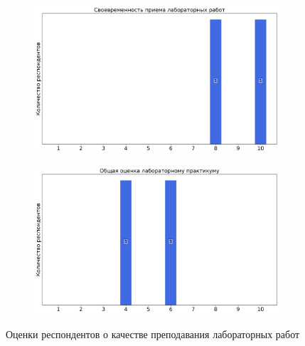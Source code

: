 \begin{figure}[H]
\begin{subfigure}[b]{0.45\textwidth}
				\includegraphics[width=\textwidth]{images/2 course/Радиотехнические цепи и сигналы/labniks-marks-Двойнишников Д.А. -2.png}
			\end{subfigure}
			\begin{subfigure}[b]{0.45\textwidth}
				\centering
				\includegraphics[width=\textwidth]{images/2 course/Радиотехнические цепи и сигналы/labniks-marks-Двойнишников Д.А. -3.png}
			\end{subfigure}	
			\caption{Оценки респондентов о качестве преподавания лабораторных работ}
		\end{figure}


    
